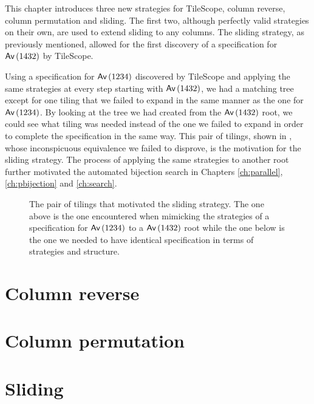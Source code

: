 \label{ch:strats}
This chapter introduces three new strategies for TileScope, column reverse, column permutation and sliding. The first two, although perfectly valid strategies on their own, are used to extend sliding to any columns. The sliding strategy, as previously mentioned, allowed for the first discovery of a specification for $\textsf{Av}\left(1432\right)$ by TileScope. 

Using a specification for $\textsf{Av}\left(1234\right)$ discovered by TileScope and applying the same strategies at every step starting with $\textsf{Av}\left(1432\right)$, we had a matching tree except for one tiling that we failed to expand in the same manner as the one for $\textsf{Av}\left(1234\right)$. By looking at the tree we had created from the $\textsf{Av}\left(1432\right)$ root, we could see what tiling was needed instead of the one we failed to expand in order to complete the specification in the same way. This pair of tilings, shown in , whose inconspicuous equivalence we failed to disprove, is the motivation for the sliding strategy. The process of applying the same strategies to another root further motivated the automated bijection search in Chapters \ref{ch:parallel}, \ref{ch:pbijection} and \ref{ch:search}.

\begin{figure}[ht!]
    \centering
    
    \caption{The pair of tilings that motivated the sliding strategy. The one above is the one encountered when mimicking the strategies of a specification for $\textsf{Av}\left(1234\right)$ to a $\textsf{Av}\left(1432\right)$ root while the one below is the one we needed to have identical specification in terms of strategies and structure.}
    \label{fig:slidepair}
\end{figure}

\section{Column reverse}

\section{Column permutation}

\section{Sliding}
